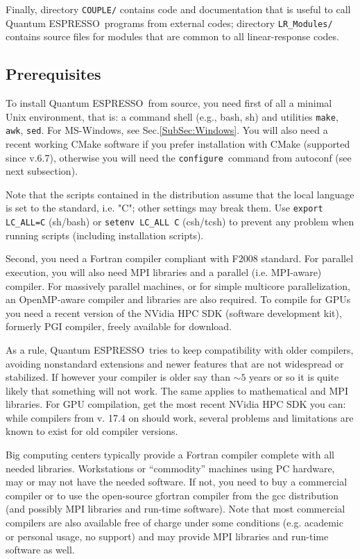 \documentclass[12pt,a4paper]{article}
\def\qe{{\sc Quantum ESPRESSO}}
\def\configure{\texttt{configure}}
\def\make{\texttt{make}}
\begin{document}
Finally, directory \texttt{COUPLE/} contains code and documentation
that is useful to call \qe\ programs from external codes; directory
\texttt{LR\_Modules/} contains source files for modules that are common
to all linear-response codes.
\subsection{Prerequisites}
\label{Sec:Installation}

To install \qe\ from source, you need first of all a minimal Unix
environment, that is: a command shell (e.g., bash, sh) and utilities \make,
\texttt{awk}, \texttt{sed}. For MS-Windows, see Sec.\ref{SubSec:Windows}.
You will also need a recent working CMake software if you prefer installation 
with CMake (supported since v.6.7), otherwise you will need the
\configure\ command from autoconf (see next subsection).

Note that the scripts contained
in the distribution assume that the local  language is set to the
standard, i.e. "C"; other settings
may break them. Use \texttt{export LC\_ALL=C} (sh/bash) or
\texttt{setenv LC\_ALL C} (csh/tcsh) to prevent any problem
when running scripts (including installation scripts).

Second, you need a Fortran compiler compliant with F2008 standard.
For parallel execution, you will also need MPI libraries and a parallel
(i.e. MPI-aware) compiler. For massively parallel machines, or
for simple multicore parallelization, an OpenMP-aware compiler
and libraries are also required. To compile for GPUs you need a
recent version of the NVidia HPC SDK (software development kit),
formerly PGI compiler, freely available for download.

As a rule, \qe\ tries to keep compatibility with older compilers,
avoiding nonstandard extensions and newer features that are not
widespread or stabilized. If however your compiler is older say
than $\sim 5$ years or so it is quite likely that something will
not work. The same applies to mathematical and MPI libraries.
For GPU compilation, get the most recent NVidia HPC SDK you can:
while compilers from v. 17.4 on should work, several problems and
limitations are known to exist for old compiler versions.

Big computing centers typically provide a Fortran compiler complete
with all needed libraries. Workstations or ``commodity'' machines
using PC hardware, may or may not have the needed software. If not,
you need to buy a commercial compiler or to use the open-source gfortran
compiler from the gcc distribution (and possibly MPI libraries and run-time
software). Note that most commercial compilers are also available
free of charge under some conditions (e.g. academic or personal usage, no
support) and may provide MPI libraries and run-time software as well.
\end{document}

